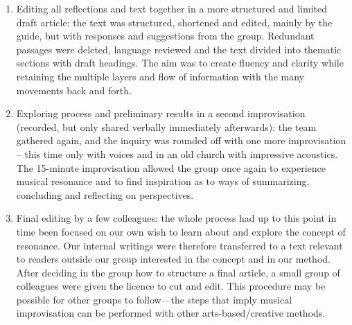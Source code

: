 \begin{adjmulticols}{2}{0mm}{0mm}
\begin{enumerate}
    \item Editing all reflections and text together in a more structured and limited draft article: the text was structured, shortened and edited, mainly by the guide, but with responses and suggestions from the group. Redundant passages were deleted, language reviewed and the text divided into thematic sections with draft headings. The aim was to create fluency and clarity while retaining the multiple layers and flow of information with the many movements back and forth.
    \item Exploring process and preliminary results in a second improvisation (recorded, but only shared verbally immediately afterwards): the team gathered again, and the inquiry was rounded off with one more improvisation – this time only with voices and in an old church with impressive acoustics. The 15-minute improvisation allowed the group once again to experience musical resonance and to find inspiration as to ways of summarizing, concluding and reflecting on perspectives.
    \item Final editing by a few colleagues: the whole process had up to this point in time been focused on our own wish to learn about and explore the concept of resonance. Our internal writings were therefore transferred to a text relevant to readers outside our group interested in the concept and in our method. After deciding in the group how to structure a final article, a small group of colleagues were given the licence to cut and edit.
This procedure may be possible for other groups to follow—the steps that imply musical improvisation can be performed with other arts-based/creative methods.
    \end{enumerate}


\end{adjmulticols}
